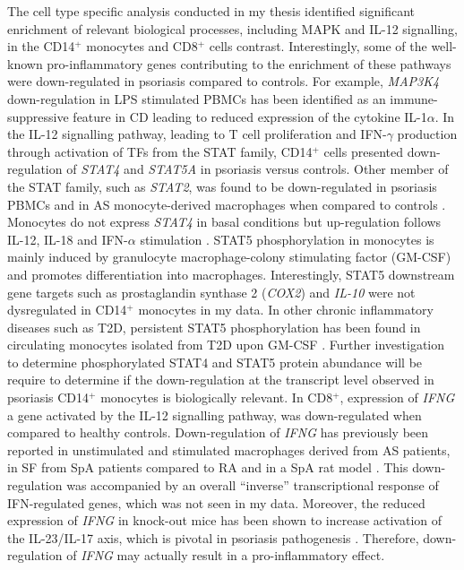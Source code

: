 The cell type specific analysis conducted in my thesis identified significant enrichment of relevant biological processes, including MAPK and IL-12 signalling, in the CD14$^+$ monocytes and CD8$^+$ cells contrast. Interestingly, some of the well-known pro-inflammatory genes contributing to the enrichment of these pathways were down-regulated in psoriasis compared to controls. For example, \textit{MAP3K4} down-regulation in LPS stimulated PBMCs has been identified as an immune-suppressive feature in CD leading to reduced expression of the cytokine IL-1$\alpha$. In the IL-12 signalling pathway, leading to T cell proliferation and IFN-$\gamma$ production through activation of TFs from the STAT family, CD14$^+$ cells presented down-regulation of \textit{STAT4} and \textit{STAT5A} in psoriasis versus controls. Other member of the STAT family, such as \textit{STAT2}, was found to be down-regulated in psoriasis PBMCs and in AS monocyte-derived macrophages when compared to controls \parencite{Coda2012,Smith2008}. Monocytes do not express \textit{STAT4} in basal conditions but up-regulation follows IL-12, IL-18 and IFN-$\alpha$ stimulation \parencite{Frucht2000,Schindler2001}. STAT5 phosphorylation in monocytes is mainly induced by granulocyte macrophage-colony stimulating factor (GM-CSF) and promotes differentiation into macrophages. Interestingly, STAT5 downstream gene targets such as prostaglandin synthase 2 (\textit{COX2}) and \textit{IL-10} were not dysregulated in CD14$^+$ monocytes in my data. In other chronic inflammatory diseases such as T2D, persistent STAT5 phosphorylation has been found in circulating monocytes isolated from T2D upon GM-CSF \parencite{Litherland2005}. Further investigation to determine phosphorylated STAT4 and STAT5 protein abundance will be require to determine if the down-regulation at the transcript level observed in psoriasis CD14$^+$ monocytes is biologically relevant. In CD8$^+$, expression of \textit{IFNG} a gene activated by the IL-12 signalling pathway, was down-regulated when compared to healthy controls. Down-regulation of \textit{IFNG} has previously been reported in unstimulated and stimulated macrophages derived from AS patients, in SF from SpA patients compared to RA and in a SpA rat model \parencite{Smith2008,Fert2014, }. This down-regulation was accompanied by an overall “inverse” transcriptional response of IFN-regulated genes, which was not seen in my data. Moreover, the reduced expression of \textit{IFNG} in knock-out mice has been shown to increase activation of the IL-23/IL-17 axis, which is pivotal in psoriasis pathogenesis \parencite{Canete2000,Chu2007}. Therefore, down-regulation of \textit{IFNG} may actually result in a pro-inflammatory effect. 

